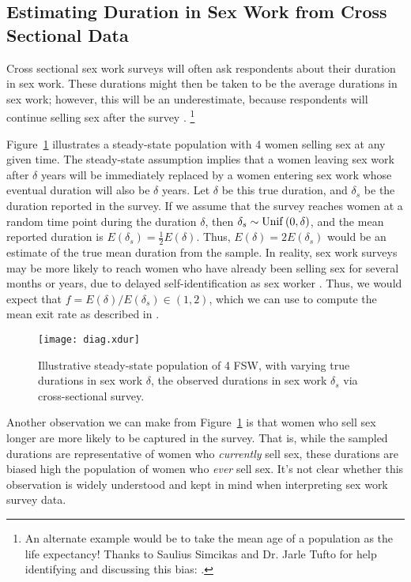 \subsection{Estimating Duration in Sex Work from Cross Sectional Data}\label{app.model.math.xdur}
Cross sectional sex work surveys will often ask respondents about their duration in sex work.
These durations might then be taken to be the average durations in sex work;
however, this will be an underestimate,
because respondents will continue selling sex after the survey \cite{Fazito2012}.%
\footnote{An alternate example would be
  to take the mean age of a population as the life expectancy!
  Thanks to Saulius Simcikas and Dr. Jarle Tufto
  for help identifying and discussing this bias:
  .}
\par
Figure~\ref{fig:diag.xdur} illustrates a steady-state population
with 4 women selling sex at any given time.
The steady-state assumption implies that a women leaving sex work after $\delta$ years
will be immediately replaced by a women entering sex work
whose eventual duration will also be $\delta$ years.
Let $\delta$ be this true duration, and $\delta_s$ be the duration reported in the survey.
If we assume that the survey reaches women at a random time point during the duration $\delta$,
then $\delta_s \sim \operatorname{Unif}\,(0,\delta)$,
and the mean reported duration is $E(\delta_s) = \frac{1}{2}E(\delta)$.
Thus, $E(\delta) = 2 E(\delta_s)$ would be an estimate of the true mean duration from the sample.
In reality, sex work surveys may be more likely to reach
women who have already been selling sex for several months or years,
due to delayed self-identification as sex worker \cite{Cheuk2020}.
Thus, we would expect that $f = E(\delta) / E(\delta_s) \in (1,2)$,
which we can use to compute the mean exit rate as described in .
\begin{figure}[h]
  \centering
  \texttt{[image: diag.xdur]}
  \caption{Illustrative steady-state population of 4 FSW,
    with varying true durations in sex work $\delta$,
    \vs the observed durations in sex work $\delta_s$ via cross-sectional survey.}
  \label{fig:diag.xdur}
\end{figure}
\par
Another observation we can make from Figure~\ref{fig:diag.xdur} is that
women who sell sex longer are more likely to be captured in the survey.
That is, while the sampled durations are representative of women who \emph{currently} sell sex,
these durations are biased high \vs the population of women who \emph{ever} sell sex.
It's not clear whether this observation is widely understood
and kept in mind when interpreting sex work survey data.
